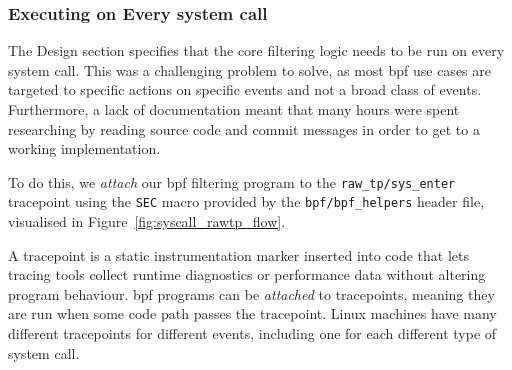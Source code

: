 \subsubsection{Executing on Every system call}

The Design section specifies that the core filtering logic needs to be run on
every system call. This was a challenging problem to solve, as most \ac{bpf}
use cases are targeted to specific actions on specific events and not a broad
class of events. Furthermore, a lack of documentation meant that many hours were
spent researching by reading source code and commit messages in order to get to
a working implementation.

To do this, we \textit{attach} our \ac{bpf} filtering program to
the \texttt{raw\_tp/sys\_enter} tracepoint using the \texttt{SEC} macro provided
by the \texttt{bpf/bpf\_helpers} header file, visualised in Figure~\ref{fig:syscall_rawtp_flow}.

A tracepoint is a static instrumentation marker inserted into code that lets tracing 
tools collect runtime diagnostics or performance data without altering program 
behaviour. \ac{bpf} programs can be \textit{attached} to tracepoints, meaning they 
are run when some code path passes the tracepoint. Linux machines have many 
different tracepoints for different events, including one for each different type of 
system call. 

